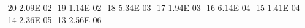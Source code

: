 -20	2.09E-02
-19	1.14E-02
-18	5.34E-03
-17	1.94E-03
-16	6.14E-04
-15	1.41E-04
-14	2.36E-05
-13	2.56E-06

